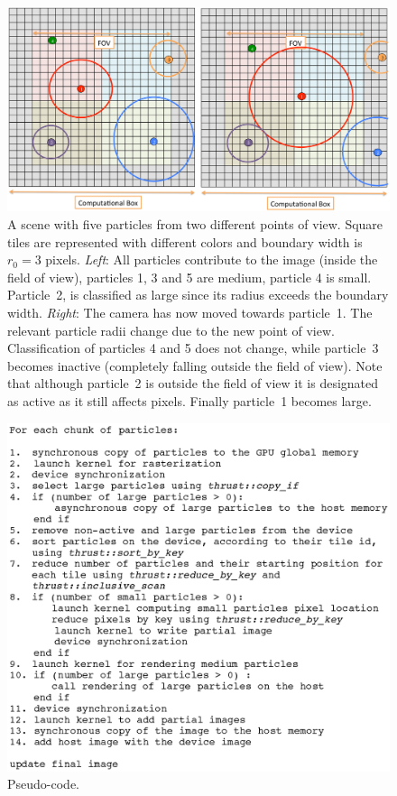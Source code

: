 \documentclass[preprint,5pt]{elsarticle}
\begin{document}
\begin{figure}
\centering
\includegraphics[scale=0.14]{fov.eps}
\caption{A scene with five particles from two different points of view. Square tiles are
represented with different colors and boundary width is $r_0=3$ pixels. {\em Left}: All particles contribute to the image (inside the field of view), particles 1, 3 and 5
are medium, particle 4 is small. Particle~2, is classified as large since its radius exceeds the boundary width. {\em Right}: The camera has now moved towards particle~1. The relevant particle radii change due to the new point
of view. Classification of particles 4 and 5 does not change, while particle~3
becomes inactive (completely falling outside the field of view). Note that although particle~2 is outside the field of view it is designated as active as it still affects pixels.
Finally particle~1 becomes large.
}
\label{fig:fov}
\end{figure}

\begin{figure}
\centering
\includegraphics[scale=0.6]{sketch.eps}
\caption{Pseudo-code.
}
\label{fig:pseudo-code}
\end{figure}
\end{document}
